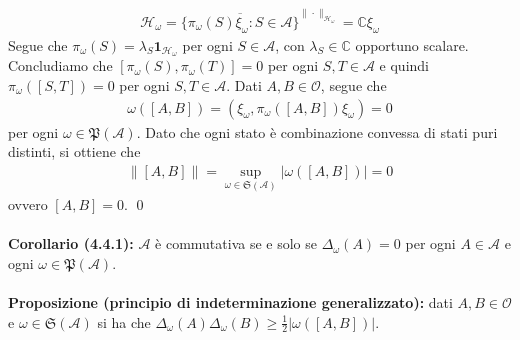 \documentclass{article}
\numberwithin{equation}{subsection}
\begin{document}
\begin{align*}
    \mathcal{H}_\omega = \overline{\{\pi_\omega(S)\xi_\omega : S \in \mathscr{A}\}}^{\|\cdot\|_{\mathcal{H}_\omega}} = \mathbb{C}\xi_\omega
\end{align*}
Segue che $\pi_\omega(S) = \lambda_S\mathbf{1}_{\mathcal{H}_\omega}$ per ogni $S \in \mathscr{A}$, con $\lambda_S \in \mathbb{C}$ opportuno scalare. Concludiamo che $[\pi_\omega(S), \pi_\omega(T)] = 0$ per ogni $S, T \in \mathscr{A}$ e quindi $\pi_\omega([S, T]) = 0$ per ogni $S, T \in \mathscr{A}$. Dati $A, B \in \mathscr{O}$, segue che
\begin{align*}
    \omega([A, B]) = (\xi_\omega, \pi_\omega([A, B])\xi_\omega) = 0
\end{align*}
per ogni $\omega \in \mathfrak{P}(\mathscr{A})$. Dato che ogni stato è combinazione convessa di stati puri distinti, si ottiene che
\begin{align*}
    \|[A, B]\| = \sup_{\omega \in \mathfrak{S}(\mathscr{A})} |\omega([A, B])| = 0
\end{align*}
ovvero $[A, B] = 0$. \qed \\ \\
\textbf{Corollario (4.4.1):} $\mathscr{A}$ è commutativa se e solo se $\Delta_\omega(A) = 0$ per ogni $A \in \mathscr{A}$ e ogni $\omega \in \mathfrak{P}(\mathscr{A})$. \\ \\
\textbf{Proposizione (principio di indeterminazione generalizzato):} dati $A, B \in \mathscr{O}$ e $\omega \in \mathfrak{S}(\mathscr{A})$ si ha che $\Delta_\omega(A)\Delta_\omega(B) \geq \frac{1}{2}|\omega([A, B])|$. \\
\end{document}

